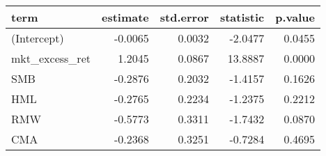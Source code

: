 \begin{table}[ht]
\centering
\begin{tabular}{lrrrr}
  \hline
term & estimate & std.error & statistic & p.value \\ 
  \hline
(Intercept) & -0.0065 & 0.0032 & -2.0477 & 0.0455 \\ 
  mkt\_excess\_ret & 1.2045 & 0.0867 & 13.8887 & 0.0000 \\ 
  SMB & -0.2876 & 0.2032 & -1.4157 & 0.1626 \\ 
  HML & -0.2765 & 0.2234 & -1.2375 & 0.2212 \\ 
  RMW & -0.5773 & 0.3311 & -1.7432 & 0.0870 \\ 
  CMA & -0.2368 & 0.3251 & -0.7284 & 0.4695 \\ 
   \hline
\end{tabular}
\label{tab: summary_neg_ESG_L}
\end{table}

